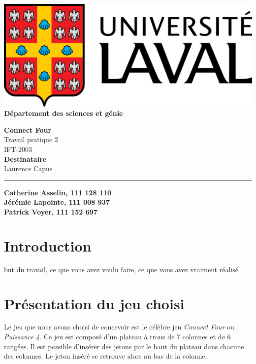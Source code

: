 \documentclass[12pt]{article}
\begin{document}
\begin{titlepage}
	\begin{minipage}{0.5\textwidth}
		\begin{flushleft}
			\includegraphics[scale=0.1]{logo.png} \\
			\textbf{Département des sciences et génie}
		\end{flushleft}
	\end{minipage}
	\vspace{150px}
	\begin{center} \large
		\textbf{Connect Four} \\
		Travail pratique 2 \\
		IFT-2003 \\
		\vspace{150px}
		\textbf{Destinataire} \\
		Laurence Capus
	\end{center}
	\vfill
	\rule{\linewidth}{.5pt}
	\newline
	\textbf{Catherine Asselin, 111 128 110} \\
	\textbf{Jérémie Lapointe, 111 008 937} \\
	\textbf{Patrick Voyer, 111 152 697}
\end{titlepage}

\newpage
\setcounter{page}{1}

\section*{Introduction}
but du travail, ce que vous avez voulu faire, ce que vous avez vraiment réalisé

\section*{Présentation du jeu choisi}
Le jeu que nous avons choisi de concevoir est le célèbre jeu \textit{Connect Four} ou \textit{Puissance 4}. Ce jeu est composé d'un plateau à trous de 7 colonnes et de 6 rangées. Il est possible d'insérer des jetons par le haut du plateau dans chacune des colonnes. Le jeton inséré se retrouve alors au bas de la colonne. \\
\end{document}
